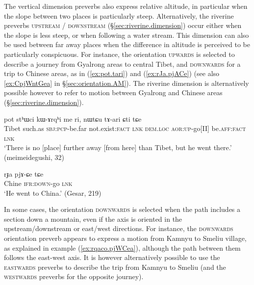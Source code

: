 The vertical dimension preverbs also express relative altitude, in particular when the slope between two places is particularly steep. Alternatively, the riverine preverbs \textsc{upstream} / \textsc{downstream} (§\ref{sec:riverine.dimension}) occur either when the slope is less steep, or when following a water stream. This dimension can also be used between far away places when the difference in altitude is perceived to be particularly conspicuous. For instance, the orientation \textsc{upwards} is selected to describe a journey from Gyalrong areas to central Tibet, and \textsc{downwards} for a trip to Chinese areas, as in (\ref{ex:pot.tari}) and (\ref{ex:rJa.pjACe}) (see also \ref{ex:CpjWntGea} in §\ref{sec:orientation.AM}). The riverine dimension is alternatively possible however to refer to motion between Gyalrong and Chinese areas (§\ref{sec:riverine.dimension}).

\begin{exe}
\ex \label{ex:pot.tari}
\gll  pot stʰɯci kɯ-ɤrqʰi me ri, nɯtɕu tɤ-ari ɕti tɕe \\
Tibet such.as \textsc{sbj}:\textsc{pcp}-be.far not.exist:\textsc{fact} \textsc{lnk} \textsc{dem}.\textsc{loc} \textsc{aor}:\textsc{up}-go[II] be.\textsc{aff}:\textsc{fact} \textsc{lnk} \\
\glt `There is no [place] further away [from here] than Tibet, but he went there.' (meimeidegushi, 32)
\end{exe}

\begin{exe}
\ex \label{ex:rJa.pjACe}
\gll rɟa pjɤ-ɕe tɕe \\
Chine \textsc{ifr}:\textsc{down}-go \textsc{lnk} \\
\glt `He went to China.' (Gesar, 219) 
\end{exe}

In some cases, the orientation \textsc{downwards} is selected when the path includes a section down a mountain, even if the axis is oriented in the upstream/downstream or east/west directions. For instance, the \textsc{downwards} orientation preverb appears to express a motion from  Kamnyu to   Smeliu village, as explained in example (\ref{ex:rqaco.pjWCea}), although the path between them follows the east-west axis. It is however alternatively possible to use the \textsc{eastwards} preverbs to describe the trip from Kamnyu to Smeliu (and the \textsc{westwards} preverbs for the opposite journey).


